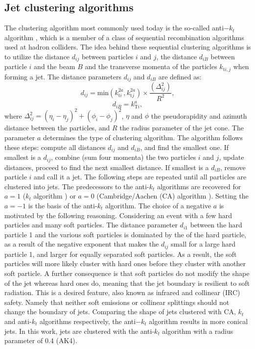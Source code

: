 \subsection*{Jet clustering algorithms}
\noindent\justify
The clustering algorithm most commonly used today is the so-called anti$-k_t$ algorithm \cite{Cacciari:2008gp}, which is a member of a class of sequential recombination algorithms used at hadron colliders. 
The idea behind these sequential clustering algorithms is to utilize the distance $d_{ij}$ between particles $i$ and $j$, the distance $d_{iB}$ between particle $i$ and the beam $B$ and the transverse momenta of the particles $k_{\mathrm{t}i,j}$ when forming a jet. 
The distance parameters $d_{ij}$ and $d_{iB}$ are defined as:
\begin{equation}
d_{ij}=\mathrm{min}(k_{\mathrm{t}i}^{2a}, k_{\mathrm{t}j}^{2a})\times\frac{(\Delta_{ij}^{2})}{R^{2}},
\end{equation}
\begin{equation}
d_{iB}=k_{\mathrm{T}i}^{a},
\end{equation}
where $\Delta_{ij}^{2}=(\eta_{i}-\eta_{j})^{2}+(\phi_{i}-\phi_{j})^{2}$, $\eta$ and $\phi$ the pseudorapidity and azimuth distance between the particles, and $R$ the radius parameter of the jet cone.
The parameter $a$ determines the type of clustering algorithm. 
The algorithm follows these steps: compute all distances $d_{ij}$ and $d_{iB}$, and find the smallest one. 
If smallest is a $d_{ij}$, combine (sum four momenta) the two particles $i$ and $j$, update distances, proceed to find the next smallest distance. 
If smallest is a $d_{iB}$, remove particle $i$ and call it a jet. 
The following steps are repeated until all particles are clustered into jets. 
\newpara
\noindent\justify
The predecessors to the anti-$k_t$ algorithms are recovered for $a=1$ ($k_{t}$ algorithm \cite{Salam:2009jx}) or $a=0$ (Cambridge/Aachen (CA) algorithm \cite{Dokshitzer:1997in}).  
Setting the $a=-1$ is the basis of the anti-$k_t$ algorithm. 
The choice of a negative $a$ is motivated by the following reasoning. 
Considering an event with a few hard particles and many soft particles. 
The distance parameter $d_{i1}$ between the hard particle 1 and the various soft particles is dominated by the \pt of the hard particle, as a result of the negative exponent that makes the $d_{ij}$ small for a large \pt hard particle 1, and larger for equally separated soft particles. 
As a result, the soft particles will more likely cluster with hard ones before they cluster with another soft particle. 
A further consequence is that soft particles do not modify the shape of the jet whereas hard ones do, meaning that the jet boundary is resilient to soft radiation. 
This is a desired feature, also known as infrared and collinear (IRC) safety. Namely that neither soft emissions or collinear splittings should not change the boundary of jets. 
Comparing the shape of jets clustered with CA, $k_t$ and anti-$k_t$ algorithms respectively, the anti$-k_t$ algorithm results in more conical jets.
In this work, jets are clustered with the anti-$k_t$ algorithm with a radius parameter of 0.4 (AK4). 
